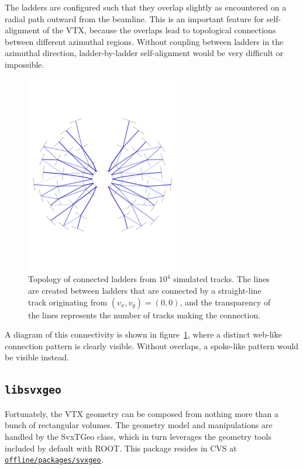 \documentclass[12pt]{article}
\begin{document}
The ladders are configured such that they overlap slightly as encountered on a radial path outward from the beamline. This is an important feature for self-alignment of the VTX, because the overlaps lead to topological connections between different azimuthal regions. Without coupling between ladders in the azimuthal direction, ladder-by-ladder self-alignment would be very difficult or impossible. 
\vspace{-2cm}
\begin{figure}
\centering
\includegraphics[width=0.6\textwidth]{topology}
\caption{Topology of connected ladders from $10^4$ simulated tracks. The lines are created between ladders that are connected by a straight-line track originating from $(v_x, v_y) = (0,0)$, and the transparency of the lines represents the number of tracks making the connection.}
\label{fig:topo}
\end{figure}
\vspace{-2cm}
A diagram of this connectivity is shown in figure~\ref{fig:topo}, where a distinct web-like connection pattern is clearly visible. Without overlaps, a spoke-like pattern would be visible instead.

\subsection{\texttt{libsvxgeo}} \label{sec:svxgeo}
Fortunately, the VTX geometry can be composed from nothing more than a bunch of rectangular volumes. The geometry model and manipulations are handled by the SvxTGeo class, which in turn leverages the geometry tools included by default with ROOT. This package resides in CVS at \href{https://www.phenix.bnl.gov/viewvc/viewvc.cgi/phenix/offline/packages/svxgeo}{\texttt{offline/\-packages/\-svxgeo}}.
\end{document}
